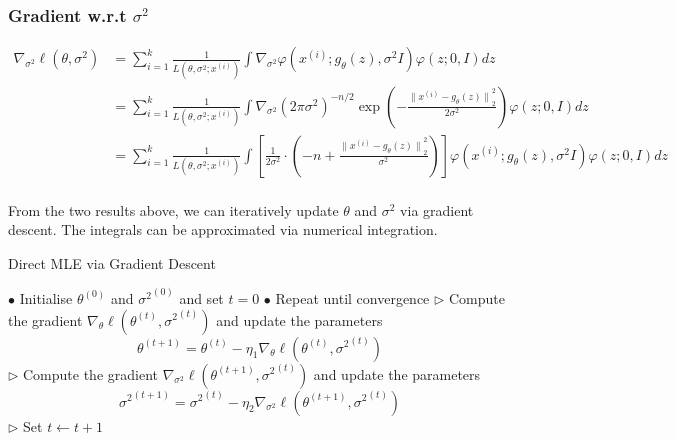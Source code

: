 \subsubsection*{Gradient w.r.t $\sigma^{2}$}
\begin{equation*}
\begin{aligned}
\nabla_{\sigma^{2}} \ell(\theta, \sigma^{2}) &= \sum_{i=1}^{k} \frac{1}{L \left(\theta, \sigma^{2}; x^{(i)} \right)} \int \nabla_{\sigma^{2}} \varphi\left(x^{(i)} ; g_{\theta}(z), \sigma^{2} I\right) \varphi(z ; 0, I) dz \\
&= \sum_{i=1}^{k} \frac{1}{L \left(\theta, \sigma^{2}; x^{(i)} \right)} \int \nabla_{\sigma^{2}} \left(2\pi\sigma^{2}\right)^{-n/2} \exp \left(-\frac{{\lVert x^{(i)} - g_{\theta}(z) \rVert}_{2}^{2}}{2\sigma^{2}}\right) \varphi(z ; 0, I) dz \\
&= \sum_{i=1}^{k} \frac{1}{L \left(\theta, \sigma^{2}; x^{(i)} \right)} \int \left[\frac{1}{2\sigma^{2}} \cdot \left(-n + \frac{{\lVert x^{(i)} - g_{\theta}(z) \rVert}_{2}^{2}} {\sigma^{2}}\right)\right] \varphi\left(x^{(i)} ; g_{\theta}(z), \sigma^{2} I\right) \varphi(z ; 0, I) dz \\
\end{aligned}
\end{equation*}

From the two results above, we can iteratively update $\theta$ and $\sigma^{2}$ via gradient descent. The integrals can be approximated via numerical integration.

\begin{algorithm}
\caption{Direct MLE via Gradient Descent}
\begin{algorithmic}
\STATE $\bullet$ Initialise $\theta^{(0)}$ and ${\sigma^{2}}^{(0)}$ and set $t=0$
\STATE $\bullet$ Repeat until convergence
\STATE \hspace{0.5cm} $\triangleright$ Compute the gradient $\nabla_{\theta} \ell \left(\theta^{(t)}, {\sigma^{2}}^{(t)}\right)$ and update the parameters
\begin{equation*}
\theta^{(t+1)}=\theta^{(t)}-\eta_{1} \nabla_{\theta}  \ell \left(\theta^{(t)}, {\sigma^{2}}^{(t)}\right)
\end{equation*}
\STATE \hspace{0.5cm} $\triangleright$ Compute the gradient $\nabla_{\sigma^{2}} \ell \left(\theta^{(t+1)}, {\sigma^{2}}^{(t)}\right)$ and update the parameters
\begin{equation*}
{\sigma^{2}}^{(t+1)}={\sigma^{2}}^{(t)}-\eta_{2} \nabla_{\sigma^{2}} \ell \left(\theta^{(t+1)}, {\sigma^{2}}^{(t)}\right)
\end{equation*}
\STATE \hspace{0.5cm} $\triangleright$ Set $t \leftarrow t+1$
\end{algorithmic}
\end{algorithm}
